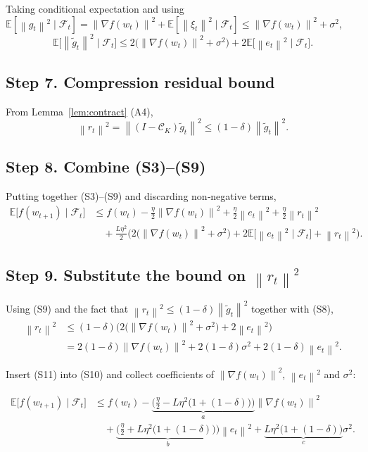 \documentclass{article}
\newcommand{\E}{\mathbb{E}}
\newcommand{\norm}[1]{\left\|#1\right\|}
\newcommand{\topk}{\mathcal{C}_K}
\begin{document}
Taking conditional expectation and using $\E[\norm{g_t}^{2}\mid\mathcal{F}_t]
 = \norm{\nabla f(w_t)}^{2}+\E[\norm{\xi_t}^{2}\mid\mathcal{F}_t]
 \le \norm{\nabla f(w_t)}^{2}+\sigma^{2}$,
\[
\E\!\big[\norm{\tilde g_t}^{2}\mid\mathcal{F}_t\big]
\le 2\big(\norm{\nabla f(w_t)}^{2}+\sigma^{2}\big)+2\E\!\big[\norm{e_t}^{2}\mid\mathcal{F}_t\big].
\tag{S8}
\]

\subsection*{Step 7. Compression residual bound}
From Lemma~\ref{lem:contract} (A4),
\[
\norm{r_t}^{2}= \norm{(I-\topk)\tilde g_t}^{2}
               \le (1-\delta)\norm{\tilde g_t}^{2}.
\tag{S9}
\]

\subsection*{Step 8. Combine (S3)–(S9)}
Putting together (S3)–(S9) and discarding non‑negative terms,
\[
\begin{aligned}
\E\!\big[f(w_{t+1})\mid\mathcal{F}_t\big]
&\le f(w_t)
   -\frac{\eta}{2}\norm{\nabla f(w_t)}^{2}
   +\frac{\eta}{2}\norm{e_t}^{2}
   +\frac{\eta}{2}\norm{r_t}^{2} \\[1mm]
&\quad+\frac{L\eta^{2}}{2}\Big(
      2\big(\norm{\nabla f(w_t)}^{2}+\sigma^{2}\big)
      +2\E\!\big[\norm{e_t}^{2}\mid\mathcal{F}_t\big]
      +\norm{r_t}^{2}
   \Big) .
\end{aligned}
\tag{S10}
\]

\subsection*{Step 9. Substitute the bound on $\norm{r_t}^{2}$}
Using (S9) and the fact that $\norm{r_t}^{2}\le(1-\delta)\norm{\tilde g_t}^{2}$
together with (S8),
\[
\begin{aligned}
\norm{r_t}^{2}
&\le (1-\delta)\Big(2\big(\norm{\nabla f(w_t)}^{2}+\sigma^{2}\big)
                     +2\norm{e_t}^{2}\Big)\\
&=2(1-\delta)\norm{\nabla f(w_t)}^{2}
   +2(1-\delta)\sigma^{2}
   +2(1-\delta)\norm{e_t}^{2}.
\end{aligned}
\tag{S11}
\]

Insert (S11) into (S10) and collect coefficients of $\norm{\nabla f(w_t)}^{2}$,
$\norm{e_t}^{2}$ and $\sigma^{2}$:

\[
\begin{aligned}
\E\!\big[f(w_{t+1})\mid\mathcal{F}_t\big]
&\le f(w_t)
   -\underbrace{\Big(\frac{\eta}{2}
          -L\eta^{2}\big(1+(1-\delta)\big)\Big)}_{\displaystyle a}
      \norm{\nabla f(w_t)}^{2} \\[1mm]
&\quad
   +\underbrace{\Big(\frac{\eta}{2}
          +L\eta^{2}\big(1+(1-\delta)\big)\Big)}_{\displaystyle b}
      \norm{e_t}^{2}
   +\underbrace{L\eta^{2}\big(1+(1-\delta)\big)}_{\displaystyle c}
      \sigma^{2}.
\end{aligned}
\tag{S12}
\]
\end{document}
